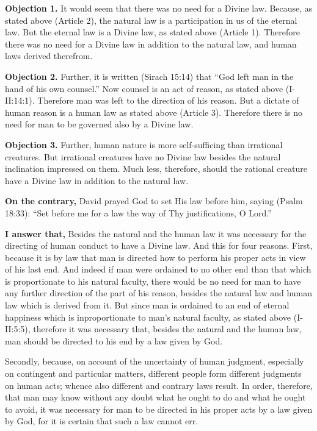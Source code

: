 
\textbf{Objection 1.} It would seem that there was no need for a Divine law. Because, as stated above (Article 2), the natural law is a participation in us of the eternal law. But the eternal law is a Divine law, as stated above (Article 1). Therefore there was no need for a Divine law in addition to the natural law, and human laws derived therefrom.

\textbf{Objection 2.} Further, it is written (Sirach 15:14) that ``God left man in the hand of his own counsel.'' Now counsel is an act of reason, as stated above (I-II:14:1). Therefore man was left to the direction of his reason. But a dictate of human reason is a human law as stated above (Article 3). Therefore there is no need for man to be governed also by a Divine law.

\textbf{Objection 3.} Further, human nature is more self-sufficing than irrational creatures. But irrational creatures have no Divine law besides the natural inclination impressed on them. Much less, therefore, should the rational creature have a Divine law in addition to the natural law.

\textbf{On the contrary,} David prayed God to set His law before him, saying (Psalm 18:33): ``Set before me for a law the way of Thy justifications, O Lord.''

\textbf{I answer that,} Besides the natural and the human law it was necessary for the directing of human conduct to have a Divine law. And this for four reasons. First, because it is by law that man is directed how to perform his proper acts in view of his last end. And indeed if man were ordained to no other end than that which is proportionate to his natural faculty, there would be no need for man to have any further direction of the part of his reason, besides the natural law and human law which is derived from it. But since man is ordained to an end of eternal happiness which is inproportionate to man's natural faculty, as stated above (I-II:5:5), therefore it was necessary that, besides the natural and the human law, man should be directed to his end by a law given by God.

Secondly, because, on account of the uncertainty of human judgment, especially on contingent and particular matters, different people form different judgments on human acts; whence also different and contrary laws result. In order, therefore, that man may know without any doubt what he ought to do and what he ought to avoid, it was necessary for man to be directed in his proper acts by a law given by God, for it is certain that such a law cannot err.

